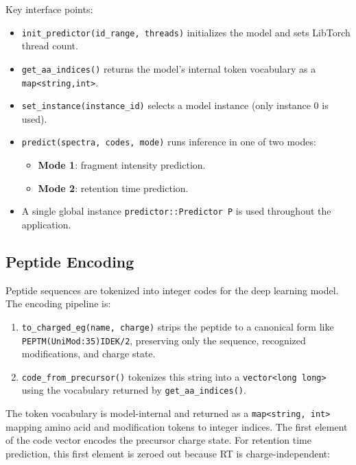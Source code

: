 \documentclass[11pt,a4paper]{article}
\begin{document}
Key interface points:
\begin{itemize}
    \item \texttt{init\_predictor(id\_range, threads)} initializes the model and sets LibTorch thread count.
    \item \texttt{get\_aa\_indices()} returns the model's internal token vocabulary as a \texttt{map<string,int>}.
    \item \texttt{set\_instance(instance\_id)} selects a model instance (only instance 0 is used).
    \item \texttt{predict(spectra, codes, mode)} runs inference in one of two modes:
    \begin{itemize}
        \item \textbf{Mode 1}: fragment intensity prediction.
        \item \textbf{Mode 2}: retention time prediction.
    \end{itemize}
    \item A single global instance \texttt{predictor::Predictor P} is used throughout the application.
\end{itemize}

\subsection{Peptide Encoding}

Peptide sequences are tokenized into integer codes for the deep learning model. The encoding pipeline is:

\begin{enumerate}
    \item \texttt{to\_charged\_eg(name, charge)} strips the peptide to a canonical form like \texttt{PEPTM(UniMod:35)IDEK/2}, preserving only the sequence, recognized modifications, and charge state.
    \item \texttt{code\_from\_precursor()} tokenizes this string into a \texttt{vector<long long>} using the vocabulary returned by \texttt{get\_aa\_indices()}.
\end{enumerate}

The token vocabulary is model-internal and returned as a \texttt{map<string, int>} mapping amino acid and modification tokens to integer indices. The first element of the code vector encodes the precursor charge state. For retention time prediction, this first element is zeroed out because RT is charge-independent:
\end{document}
